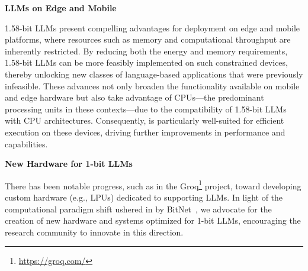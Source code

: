 \textbf{LLMs on Edge and Mobile}

1.58-bit LLMs present compelling advantages for deployment on edge and mobile platforms, where resources such as memory and computational throughput are inherently restricted. By reducing both the energy and memory requirements, 1.58-bit LLMs can be more feasibly implemented on such constrained devices, thereby unlocking new classes of language-based applications that were previously infeasible. These advances not only broaden the functionality available on mobile and edge hardware but also take advantage of CPUs—the predominant processing units in these contexts—due to the compatibility of 1.58-bit LLMs with CPU architectures. Consequently,  is particularly well-suited for efficient execution on these devices, driving further improvements in performance and capabilities.

\textbf{New Hardware for 1-bit LLMs}

There has been notable progress, such as in the Groq\footnote{\url{https://groq.com/}} project, toward developing custom hardware (e.g., LPUs) dedicated to supporting LLMs. In light of the computational paradigm shift ushered in by BitNet~\cite{bitnet}, we advocate for the creation of new hardware and systems optimized for 1-bit LLMs, encouraging the research community to innovate in this direction.